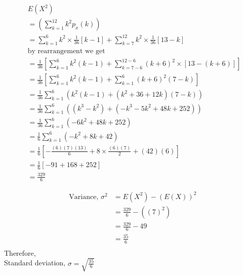 \documentclass[journal,12pt,twocolumn]{IEEEtran}
\begin{document}
\begin{group}

\allowdisplaybreaks
\begin{align}
    & E(X^2)\\
    &= \left(\sum_{k=1}^{12}k^2p_x(k)\right)\\
    &= \sum_{k=1}^{6}k^2\times\frac{1}{36}[k-1] + \sum_{k=7}^{12}k^2\times\frac{1}{36}[13-k]\\
    &\text{by rearrangement we get}\\
    &= \frac{1}{36}\left[\sum_{k=1}^{6}k^2(k-1) + \sum_{k=7-6}^{12-6}(k+6)^2\times[13-(k+6)]\right]\\
    &= \frac{1}{36}\left[\sum_{k=1}^{6}k^2(k-1) + \sum_{k=1}^{6}(k+6)^2(7-k)\right]\\
    &= \frac{1}{36}\sum_{k=1}^{6}\left(k^2(k-1) + (k^2+36+12k)(7-k)\right)\\
    &= \frac{1}{36}\sum_{k=1}^{6}\left((k^3-k^2) + (-k^3-5k^2+48k+252)\right)\\
    &= \frac{1}{36}\sum_{k=1}^{6}(-6k^2+48k+252)\\
    &= \frac{1}{6}\sum_{k=1}^{6}(-k^2+8k+42)\\
    &= \frac{1}{6}\left[ -\frac{(6)(7)(13)}{6} + 8\times\frac{(6)(7)}{2}+ (42)(6) \right]\\
    &= \displaystyle\frac{1}{6}[-91+168+252]\\
    &= \displaystyle\frac{329}{6}
\end{align}
\end{group}
\begin{align}
    \text{ Variance, }\sigma^2 &= E(X^2)-(E(X))^2\\
    &= \displaystyle\frac{329}{6}- ((7)^2)\\
    &= \displaystyle\frac{329}{6} - 49\\
    &= \displaystyle\frac{35}{6}\\
\end{align}
Therefore,\\
Standard deviation, $\sigma=\sqrt{\displaystyle\frac{35}{6}}$
\end{document}
